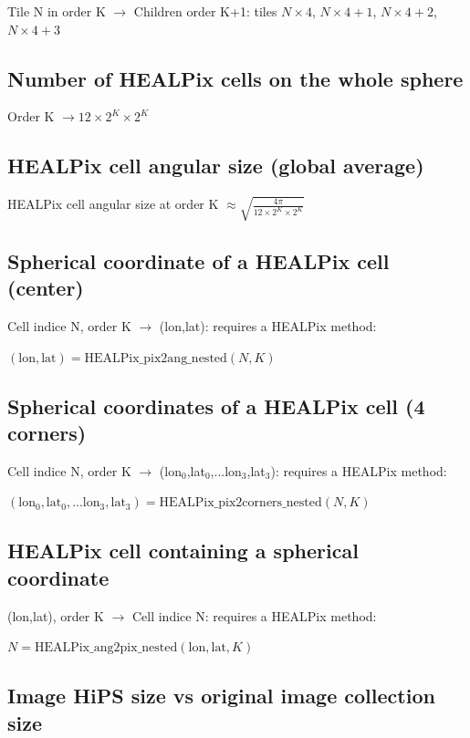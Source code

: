 \documentclass[11pt,a4paper]{ivoa}
\begin{document}
Tile N in order K $\rightarrow$ Children order K+1: tiles $N\times4$, $N\times4+1$, $N\times4+2$, $N\times4+3$

\subsection{Number of HEALPix cells on the whole sphere}

Order K $\rightarrow 12 \times 2^K \times 2^K$

\subsection{HEALPix cell angular size (global average)}

HEALPix cell angular size at order K $\approx \sqrt{\frac{4\pi}{12 \times 2^K \times 2^K}}$

\subsection{Spherical coordinate of a HEALPix cell (center)}

Cell indice N, order K $\rightarrow$ (lon,lat): requires a HEALPix method: 

$(\mathrm{lon},\mathrm{lat}) = \mathrm{HEALPix\_pix2ang\_nested}(N,K)$

\subsection{Spherical coordinates of a HEALPix cell (4 corners)}

Cell indice N, order K $\rightarrow$ (lon$_0$,lat$_0$,...lon$_3$,lat$_3$): requires a HEALPix method: 

$(\mathrm{lon}_0,\mathrm{lat}_0,...\mathrm{lon}_3,\mathrm{lat}_3) = \mathrm{HEALPix\_pix2corners\_nested}(N,K)$

\subsection{HEALPix cell containing a spherical coordinate}

(lon,lat), order K $\rightarrow$ Cell indice N: requires a HEALPix method: 

$N = \mathrm{HEALPix\_ang2pix\_nested}(\mathrm{lon},\mathrm{lat},K)$

\subsection{Image HiPS size vs original image collection size}
\end{document}
